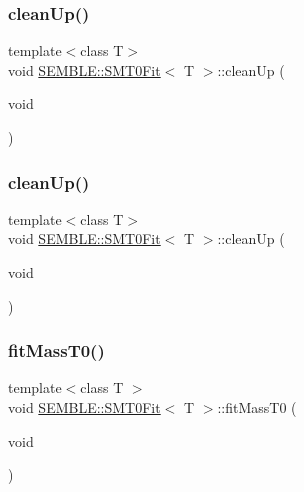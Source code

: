 \subsubsection{\texorpdfstring{cleanUp()}{cleanUp()}\hspace{0.1cm}{\footnotesize\ttfamily [1/2]}}
{\footnotesize\ttfamily template$<$class T$>$ \\
void \mbox{\hyperlink{structSEMBLE_1_1SMT0Fit}{S\+E\+M\+B\+L\+E\+::\+S\+M\+T0\+Fit}}$<$ T $>$\+::clean\+Up (\begin{DoxyParamCaption}\item[{void}]{ }\end{DoxyParamCaption})\hspace{0.3cm}{\ttfamily [inline]}}

\mbox{\label{structSEMBLE_1_1SMT0Fit_af7fdbb36395ef2aa852a7735405b3421}} 
\subsubsection{\texorpdfstring{cleanUp()}{cleanUp()}\hspace{0.1cm}{\footnotesize\ttfamily [2/2]}}
{\footnotesize\ttfamily template$<$class T$>$ \\
void \mbox{\hyperlink{structSEMBLE_1_1SMT0Fit}{S\+E\+M\+B\+L\+E\+::\+S\+M\+T0\+Fit}}$<$ T $>$\+::clean\+Up (\begin{DoxyParamCaption}\item[{void}]{ }\end{DoxyParamCaption})\hspace{0.3cm}{\ttfamily [inline]}}

\mbox{\label{structSEMBLE_1_1SMT0Fit_aeeb6d36dda0c5fae9e4bae185f8fadd9}} 
\subsubsection{\texorpdfstring{fitMassT0()}{fitMassT0()}\hspace{0.1cm}{\footnotesize\ttfamily [1/2]}}
{\footnotesize\ttfamily template$<$class T $>$ \\
void \mbox{\hyperlink{structSEMBLE_1_1SMT0Fit}{S\+E\+M\+B\+L\+E\+::\+S\+M\+T0\+Fit}}$<$ T $>$\+::fit\+Mass\+T0 (\begin{DoxyParamCaption}\item[{void}]{ }\end{DoxyParamCaption})}

